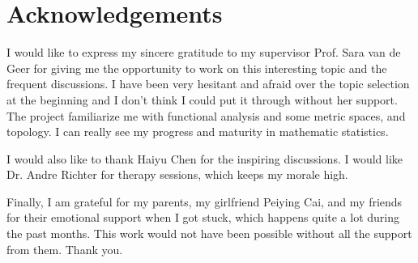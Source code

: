 \chapter*{Acknowledgements}

I would like to express my sincere gratitude to my supervisor Prof. Sara van de
Geer for giving me the opportunity to work on this interesting topic and the
frequent discussions. I have been very hesitant and afraid over the topic
selection at the beginning and I don't think I could put it through without her
support. The project familiarize me with functional analysis and some metric
spaces, and topology. I can really see my progress and maturity in mathematic
statistics. 

I would also like to thank Haiyu Chen for the inspiring discussions. I would
like Dr. Andre Richter for therapy sessions, which keeps my morale high.

Finally, I am grateful for my parents, my girlfriend Peiying Cai, and my friends
for their emotional support when I got stuck, which happens quite a lot during
the past months. This work would not have been possible without all the support
from them. Thank you.

